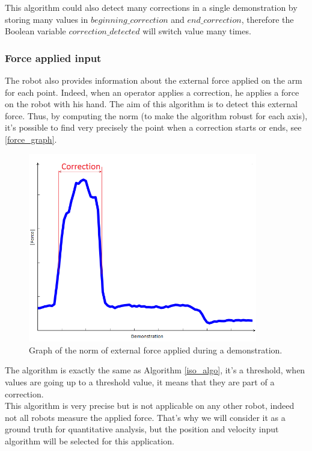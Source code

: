 This algorithm could also detect many corrections in a single demonstration by storing many values in $beginning\_correction$ and $end\_correction$, therefore the Boolean variable $correction\_detected$ will switch value many times.

\clearpage

\subsubsection{Force applied input}

The robot also provides information about the external force applied on the arm for each point. Indeed, when an operator applies a correction, he applies a force on the robot with his hand. The aim of this algorithm is to detect this external force. Thus, by computing the norm (to make the algorithm robust for each axis), it's possible to find very precisely the point when a correction starts or ends, see \autoref{force_graph}.

\begin{figure}[H]
\centering
\includegraphics[width=10cm]{img/force_graph.png}
\caption{Graph of the norm of external force applied during a demonstration.}
\label{force_graph}
\end{figure}

The algorithm is exactly the same as Algorithm \autoref{iso_algo}, it's a threshold, when values are going up to a threshold value, it means that they are part of a correction.\\

This algorithm is very precise but is not applicable on any other robot, indeed not all robots measure the applied force. That's why we will consider it as a ground truth for quantitative analysis, but the position and velocity input algorithm will be selected for this application.

